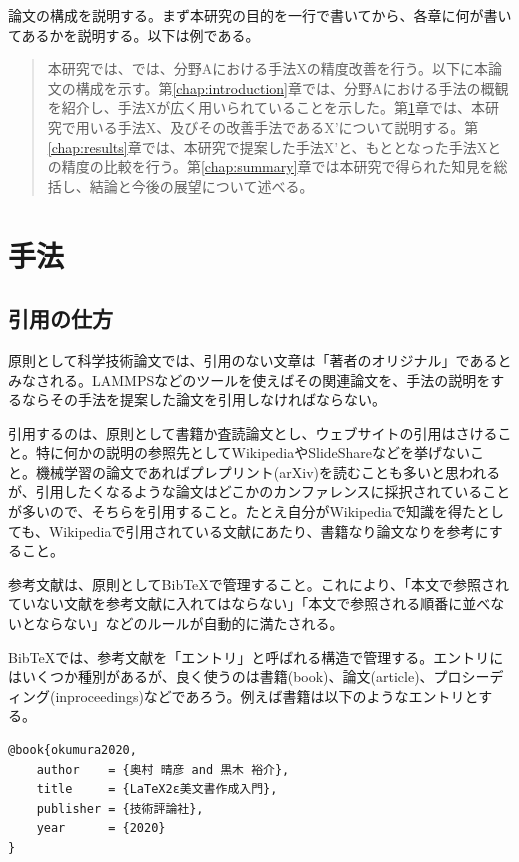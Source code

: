 \documentclass[titlepage]{jsreport}
\begin{document}
論文の構成を説明する。まず本研究の目的を一行で書いてから、各章に何が書いてあるかを説明する。以下は例である。

\begin{quotation}
    本研究では、では、分野Aにおける手法Xの精度改善を行う。以下に本論文の構成を示す。第\ref{chap:introduction}章では、分野Aにおける手法の概観を紹介し、手法Xが広く用いられていることを示した。第\ref{chap:method}章では、本研究で用いる手法X、及びその改善手法であるX'について説明する。第\ref{chap:results}章では、本研究で提案した手法X'と、もととなった手法Xとの精度の比較を行う。第\ref{chap:summary}章では本研究で得られた知見を総括し、結論と今後の展望について述べる。
\end{quotation}

\chapter{手法} \label{chap:method}

\section{引用の仕方}

原則として科学技術論文では、引用のない文章は「著者のオリジナル」であるとみなされる。LAMMPSなどのツールを使えばその関連論文を、手法の説明をするならその手法を提案した論文を引用しなければならない。

引用するのは、原則として書籍か査読論文とし、ウェブサイトの引用はさけること。特に何かの説明の参照先としてWikipediaやSlideShareなどを挙げないこと。機械学習の論文であればプレプリント(arXiv)を読むことも多いと思われるが、引用したくなるような論文はどこかのカンファレンスに採択されていることが多いので、そちらを引用すること。たとえ自分がWikipediaで知識を得たとしても、Wikipediaで引用されている文献にあたり、書籍なり論文なりを参考にすること。

参考文献は、原則としてBibTeXで管理すること。これにより、「本文で参照されていない文献を参考文献に入れてはならない」「本文で参照される順番に並べないとならない」などのルールが自動的に満たされる。

BibTeXでは、参考文献を「エントリ」と呼ばれる構造で管理する。エントリにはいくつか種別があるが、良く使うのは書籍(book)、論文(article)、プロシーディング(inproceedings)などであろう。例えば書籍は以下のようなエントリとする。

\begin{lstlisting}[language={[LaTeX]TeX}]
@book{okumura2020,
    author    = {奥村 晴彦 and 黒木 裕介},
    title     = {LaTeX2ε美文書作成入門},
    publisher = {技術評論社},
    year      = {2020}
}
\end{lstlisting}
\end{document}
